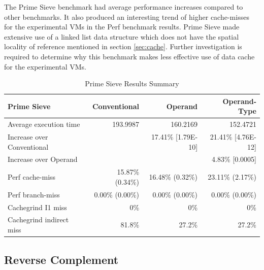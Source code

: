 \documentclass[english,a4paper,12pt]{report}
\begin{document}
The Prime Sieve benchmark had average performance increases compared
to other benchmarks. It also produced an interesting trend of higher
cache-misses for the experimental VMs in the Perf benchmark
results. Prime Sieve made extensive use of a linked list data
structure which does not have the spatial locality of reference
mentioned in section \ref{sec:cache}. Further investigation is
required to determine why this benchmark makes less effective use of
data cache for the experimental VMs.


\begin{table}[!htb]
  \begin{center}
    \begin{tabular}{lrrr}
      Prime Sieve & Conventional & Operand & Operand-Type\\
      \hline
      Average execution time & 193.9987 & 160.2169 & 152.4721\\
      Increase over Conventional &  & 17.41\% [1.79E-10] & 21.41\% [4.76E-12]\\
      Increase over Operand &  &  & 4.83\% [0.0005]\\
      Perf cache-miss & 15.87\% (0.34\%) & 16.48\% (0.32\%) & 23.11\% (2.17\%)\\
      Perf branch-miss & 0.00\% (0.00\%) & 0.00\% (0.00\%) & 0.00\% (0.00\%)\\
      Cachegrind I1 miss & 0\% & 0\% & 0\%\\
      Cachegrind indirect miss & 81.8\% & 27.2\% & 27.2\%\\
    \end{tabular}
  \end{center}
  \caption{Prime Sieve Results Summary}
\end{table}
\newpage
\subsection{Reverse Complement}
\end{document}
